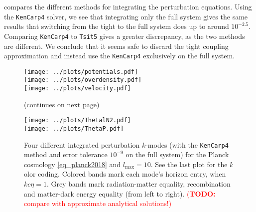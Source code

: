 \documentclass[10pt,a4paper]{article}
\newcommand\TODO[1]{\textcolor{red}{(\textbf{TODO:} #1)}}
\begin{document}
 compares the different methods for integrating the perturbation equations.
Using the \texttt{KenCarp4} solver, we see that integrating only the full system
gives the same results that switching from the tight to the full system does up to around $10^{-2.5}$.
Comparing \texttt{KenCarp4} to \texttt{Tsit5} gives a greater discrepancy, as the two methods are different.
We conclude that it seems safe to discard the tight coupling approximation and instead use the \texttt{KenCarp4} exclusively on the full system.

\begin{figure}[ht!]
\iffalse
\begin{minipage}{0.49\textwidth}
\texttt{[image: ../plots/overdensity.pdf]} \\
\texttt{[image: ../plots/ThetalN2.pdf]} \\
\texttt{[image: ../plots/potentials.pdf]} \\
\end{minipage}
\hfill
\begin{minipage}{0.49\textwidth}
\texttt{[image: ../plots/velocity.pdf]} \\
\texttt{[image: ../plots/ThetaP.pdf]} \\
\phantom{\texttt{[image: ../plots/ThetaP.pdf]}} \\ %
\end{minipage}
\fi
\centering
\texttt{[image: ../plots/potentials.pdf]} \\
\texttt{[image: ../plots/overdensity.pdf]} \\
\texttt{[image: ../plots/velocity.pdf]} \\
\caption{(continues on next page)}
\end{figure}
\begin{figure}[ht!]\ContinuedFloat
\centering
\texttt{[image: ../plots/ThetalN2.pdf]} \\
\texttt{[image: ../plots/ThetaP.pdf]} \\
\caption{%
	Four different integrated perturbation $k$-modes (with the \texttt{KenCarp4} method and error tolerance $10^{-9}$ on the full system) for the Planck cosmology \eqref{eq_planck2018} and $l_\text{max}=10$.
	See the last plot for the $k$olor coding.
	Colored bands mark each mode's horizon entry, when $k c \eta = 1$.
	Grey bands mark radiation-matter equality, recombination and matter-dark energy equality (from left to right).
	\TODO{compare with approximate analytical solutions!}
}
\label{fig_perturb_all}
\end{figure}%
\end{document}
